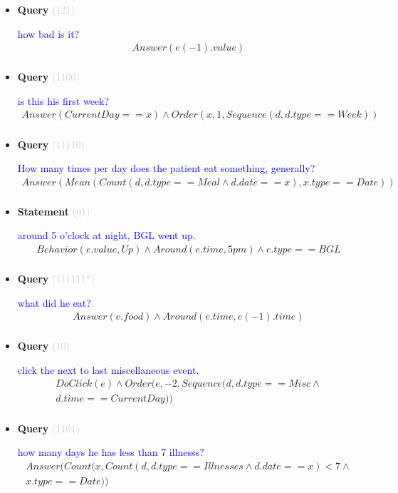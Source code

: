 \documentclass[11pt]{article}
\newcommand{\key}[1]{\textcolor{lightgray}{#1}}
\newcounter{CQuery}
\newcounter{CStatement}
\begin{document}
\begin{itemize}
\item
\textbf{Query\theCQuery} \key{(121)} \addtocounter{CQuery}{1}
\textcolor{blue}{ how bad is it? }
\begin{multline*}
Answer(e(-1).value) \\ 
\end{multline*}


\item
\textbf{Query\theCQuery} \key{(1100)} \addtocounter{CQuery}{1}
\textcolor{blue}{ is this his first week? }
\begin{multline*}
Answer(CurrentDay==x) \wedge Order(x, 1, Sequence(d, d.type==Week)) \\ 
\end{multline*}


\item
\textbf{Query\theCQuery} \key{(11110)} \addtocounter{CQuery}{1}
\textcolor{blue}{ How many times per day does the patient eat something, generally? }
\begin{multline*}
Answer(Mean(Count(d, d.type==Meal \wedge d.date==x), x.type==Date)) \\ 
\end{multline*}


\item
\textbf{Statement\theCStatement} \key{(01)} \addtocounter{CStatement}{1}
\textcolor{blue}{ around 5 o'clock at night, BGL went up. }
\begin{multline*}
Behavior(e.value, Up) \wedge Around(e.time, 5pm) \wedge e.type==BGL \\ 
\end{multline*}


\item
\textbf{Query\theCQuery} \key{(111111*)} \addtocounter{CQuery}{1}
\textcolor{blue}{ what did he eat? }
\begin{multline*}
Answer(e.food) \wedge Around(e.time, e(-1).time) \\ 
\end{multline*}


\item
\textbf{Query\theCQuery} \key{(10)} \addtocounter{CQuery}{1}
\textcolor{blue}{ click the next to last miscellaneous event. }
\begin{multline*}
DoClick(e) \wedge  Order(e, -2, Sequence(d, d.type==Misc \wedge \\ 
d.time==CurrentDay)) \\ 
\end{multline*}


\item
\textbf{Query\theCQuery} \key{(1101)} \addtocounter{CQuery}{1}
\textcolor{blue}{ how many days he has less than 7 illnesss? }
\begin{multline*}
Answer(Count(x, Count(d, d.type==Illnesses \wedge d.date==x)<7 \wedge \\ 
x.type==Date)) \\ 
\end{multline*}



\end{itemize}
\end{document}
